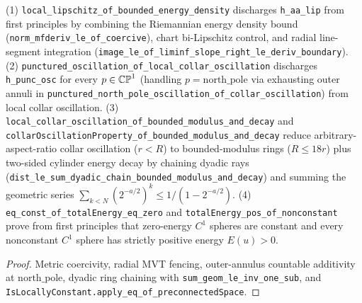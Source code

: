 \begin{theorem}
\label{n3_first_principles_reductions}
\leanok
{}
(1) \texttt{local\_lipschitz\_of\_bounded\_energy\_density} discharges \texttt{h\_aa\_lip} from first
principles by combining the Riemannian energy density bound (\texttt{norm\_mfderiv\_le\_of\_coercive}),
chart bi-Lipschitz control, and radial line-segment integration (\texttt{image\_le\_of\_liminf\_slope\_right\_le\_deriv\_boundary}).
(2) \texttt{punctured\_oscillation\_of\_local\_collar\_oscillation} discharges \texttt{h\_punc\_osc} for
every $p\in\mathbb{CP}^1$ (handling $p=\mathrm{north\_pole}$ via exhausting outer annuli in
\texttt{punctured\_north\_pole\_oscillation\_of\_collar\_oscillation}) from local collar oscillation.
(3) \texttt{local\_collar\_oscillation\_of\_bounded\_modulus\_and\_decay} and
\texttt{collarOscillationProperty\_of\_bounded\_modulus\_and\_decay} reduce arbitrary-aspect-ratio collar
oscillation ($r<R$) to bounded-modulus rings ($R\le 18r$) plus two-sided cylinder energy decay by chaining
dyadic rays (\texttt{dist\_le\_sum\_dyadic\_chain\_bounded\_modulus\_and\_decay}) and summing the geometric
series $\sum_{k<N}(2^{-a/2})^k\le 1/(1-2^{-a/2})$.
(4) \texttt{eq\_const\_of\_totalEnergy\_eq\_zero} and \texttt{totalEnergy\_pos\_of\_nonconstant} prove
from first principles that zero-energy $C^1$ spheres are constant and every nonconstant $C^1$ sphere has
strictly positive energy $E(u)>0$.
\end{theorem}
\begin{proof}\leanok Metric coercivity, radial MVT fencing, outer-annulus countable additivity at
$\mathrm{north\_pole}$, dyadic ring chaining with \texttt{sum\_geom\_le\_inv\_one\_sub}, and
\texttt{IsLocallyConstant.apply\_eq\_of\_preconnectedSpace}.\end{proof}

